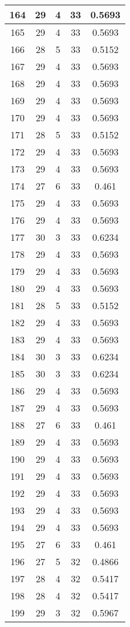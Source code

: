 \documentclass[letterpaper, 12pt]{article}
\begin{document}
\begin{longtable}{|c|c|c|c|c|}
\hline
164 & 29 & 4 & 33 & 0.5693 \\
\hline
165 & 29 & 4 & 33 & 0.5693 \\
\hline
166 & 28 & 5 & 33 & 0.5152 \\
\hline
167 & 29 & 4 & 33 & 0.5693 \\
\hline
168 & 29 & 4 & 33 & 0.5693 \\
\hline
169 & 29 & 4 & 33 & 0.5693 \\
\hline
170 & 29 & 4 & 33 & 0.5693 \\
\hline
171 & 28 & 5 & 33 & 0.5152 \\
\hline
172 & 29 & 4 & 33 & 0.5693 \\
\hline
173 & 29 & 4 & 33 & 0.5693 \\
\hline
174 & 27 & 6 & 33 & 0.461 \\
\hline
175 & 29 & 4 & 33 & 0.5693 \\
\hline
176 & 29 & 4 & 33 & 0.5693 \\
\hline
177 & 30 & 3 & 33 & 0.6234 \\
\hline
178 & 29 & 4 & 33 & 0.5693 \\
\hline
179 & 29 & 4 & 33 & 0.5693 \\
\hline
180 & 29 & 4 & 33 & 0.5693 \\
\hline
181 & 28 & 5 & 33 & 0.5152 \\
\hline
182 & 29 & 4 & 33 & 0.5693 \\
\hline
183 & 29 & 4 & 33 & 0.5693 \\
\hline
184 & 30 & 3 & 33 & 0.6234 \\
\hline
185 & 30 & 3 & 33 & 0.6234 \\
\hline
186 & 29 & 4 & 33 & 0.5693 \\
\hline
187 & 29 & 4 & 33 & 0.5693 \\
\hline
188 & 27 & 6 & 33 & 0.461 \\
\hline
189 & 29 & 4 & 33 & 0.5693 \\
\hline
190 & 29 & 4 & 33 & 0.5693 \\
\hline
191 & 29 & 4 & 33 & 0.5693 \\
\hline
192 & 29 & 4 & 33 & 0.5693 \\
\hline
193 & 29 & 4 & 33 & 0.5693 \\
\hline
194 & 29 & 4 & 33 & 0.5693 \\
\hline
195 & 27 & 6 & 33 & 0.461 \\
\hline
196 & 27 & 5 & 32 & 0.4866 \\
\hline
197 & 28 & 4 & 32 & 0.5417 \\
\hline
198 & 28 & 4 & 32 & 0.5417 \\
\hline
199 & 29 & 3 & 32 & 0.5967 \\
\hline
\end{longtable}
\end{document}
